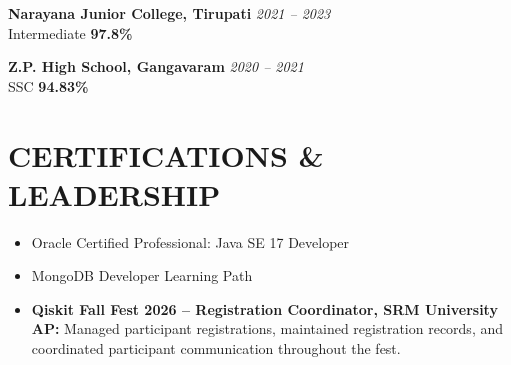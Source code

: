 \documentclass[a4paper,10pt]{article}
\begin{document}
\textbf{Narayana Junior College, Tirupati}
\hfill
\textit{2021 -- 2023}\\
Intermediate
\hfill
\textbf{97.8\%}

\textbf{Z.P. High School, Gangavaram}
\hfill
\textit{2020 -- 2021}\\
SSC
\hfill
\textbf{94.83\%}

\section*{CERTIFICATIONS \& LEADERSHIP}

\begin{itemize}
    \item Oracle Certified Professional: Java SE 17 Developer
    \item MongoDB Developer Learning Path
    \item \textbf{Qiskit Fall Fest 2026 -- Registration Coordinator, SRM University AP:} Managed participant registrations, maintained registration records, and coordinated participant communication throughout the fest.
\end{itemize}
\end{document}
